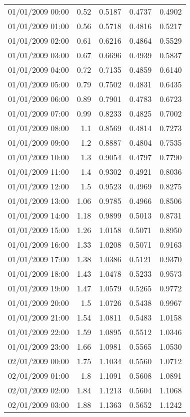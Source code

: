\begin{longtable}{|l|r|r|r|r|}
01/01/2009 00:00 & 0.52 & 0.5187 & 0.4737 & 0.4902 \\
01/01/2009 01:00 & 0.56 & 0.5718 & 0.4816 & 0.5217 \\
01/01/2009 02:00 & 0.61 & 0.6216 & 0.4864 & 0.5529 \\
01/01/2009 03:00 & 0.67 & 0.6696 & 0.4939 & 0.5837 \\
01/01/2009 04:00 & 0.72 & 0.7135 & 0.4859 & 0.6140 \\
01/01/2009 05:00 & 0.79 & 0.7502 & 0.4831 & 0.6435 \\
01/01/2009 06:00 & 0.89 & 0.7901 & 0.4783 & 0.6723 \\
01/01/2009 07:00 & 0.99 & 0.8233 & 0.4825 & 0.7002 \\
01/01/2009 08:00 & 1.1 & 0.8569 & 0.4814 & 0.7273 \\
01/01/2009 09:00 & 1.2 & 0.8887 & 0.4804 & 0.7535 \\
01/01/2009 10:00 & 1.3 & 0.9054 & 0.4797 & 0.7790 \\
01/01/2009 11:00 & 1.4 & 0.9302 & 0.4921 & 0.8036 \\
01/01/2009 12:00 & 1.5 & 0.9523 & 0.4969 & 0.8275 \\
01/01/2009 13:00 & 1.06 & 0.9785 & 0.4966 & 0.8506 \\
01/01/2009 14:00 & 1.18 & 0.9899 & 0.5013 & 0.8731 \\
01/01/2009 15:00 & 1.26 & 1.0158 & 0.5071 & 0.8950 \\
01/01/2009 16:00 & 1.33 & 1.0208 & 0.5071 & 0.9163 \\
01/01/2009 17:00 & 1.38 & 1.0386 & 0.5121 & 0.9370 \\
01/01/2009 18:00 & 1.43 & 1.0478 & 0.5233 & 0.9573 \\
01/01/2009 19:00 & 1.47 & 1.0579 & 0.5265 & 0.9772 \\
01/01/2009 20:00 & 1.5 & 1.0726 & 0.5438 & 0.9967 \\
01/01/2009 21:00 & 1.54 & 1.0811 & 0.5483 & 1.0158 \\
01/01/2009 22:00 & 1.59 & 1.0895 & 0.5512 & 1.0346 \\
01/01/2009 23:00 & 1.66 & 1.0981 & 0.5565 & 1.0530 \\
02/01/2009 00:00 & 1.75 & 1.1034 & 0.5560 & 1.0712 \\
02/01/2009 01:00 & 1.8 & 1.1091 & 0.5608 & 1.0891 \\
02/01/2009 02:00 & 1.84 & 1.1213 & 0.5604 & 1.1068 \\
02/01/2009 03:00 & 1.88 & 1.1363 & 0.5652 & 1.1242 \\

\end{longtable}
